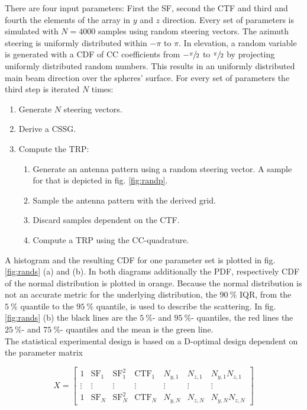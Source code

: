 There are four input parameters: First the \ac{SF}, second the \ac{CTF} and third and fourth the elements of the array in $y$ and $z$ direction. Every set of parameters is simulated with $N=4000$ samples using random steering vectors. The azimuth steering is uniformly distributed within $-\pi$ to $\pi$. In elevation, a random variable is generated with a \ac{CDF} of \ac{CC} coefficients from $-\sfrac{\pi}{2}$ to $\sfrac{\pi}{2}$ by projecting uniformly distributed random numbers. This results in an uniformly distributed main beam direction over the spheres' surface. For every set of parameters the third step is iterated $N$ times:

\begin{enumerate}
\item Generate $N$ steering vectors.
\item Derive a \ac{CSSG}.
\item Compute the \ac{TRP}:
\begin{enumerate}
\item Generate an antenna pattern using a random steering vector. A sample for that is depicted in fig. \ref{fig:randp}.
\item Sample the antenna pattern with the derived grid.
\item Discard samples dependent on the \ac{CTF}.
\item Compute a \ac{TRP} using the \ac{CC}-quadrature.
\end{enumerate}
\end{enumerate}

A histogram and the resulting \ac{CDF} for one parameter set is plotted in fig. \ref{fig:rands} (a) and (b). In both diagrams additionally the \ac{PDF}, respectively \ac{CDF} of the normal distribution is plotted in orange. Because the normal distribution is not an accurate metric for the underlying distribution, the $\SI{90}{\percent}$ \ac{IQR}, from the $\SI{5}{\percent}$ quantile to the $\SI{95}{\percent}$ quantile, is used to describe the scattering. In fig. \ref{fig:rands} (b) the black lines are the $\SI{5}{\percent}$- and $\SI{95}{\percent}$- quantiles, the red lines the $\SI{25}{\percent}$- and $\SI{75}{\percent}$- quantiles and the mean is the green line.\\
The statistical experimental design is based on a D-optimal design dependent on the parameter matrix

\begin{equation}
X = \begin{bmatrix}
1 & \text{SF}_1 & \text{SF}_1^2 & \text{CTF}_1 & N_{y,1} & N_{z,1} & N_{y,1}N_{z,1}\\
\vdots & \vdots & \vdots & \vdots & \vdots & \vdots & \vdots\\
1 & \text{SF}_N & \text{SF}_N^2 & \text{CTF}_N & N_{y,N} & N_{z,N} & N_{y,N}N_{z,N}
\end{bmatrix}
\label{eq:parammatrix}
\end{equation}

